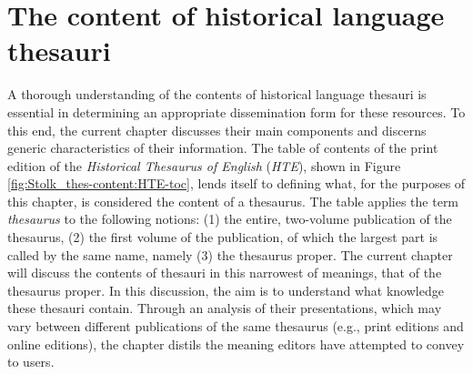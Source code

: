 

\chapter{The content of historical language thesauri}

A thorough understanding of the contents of historical language thesauri is essential in determining an appropriate dissemination form for these resources. To this end, the current chapter discusses their main components and discerns generic characteristics of their information. The table of contents of the print edition of the \textit{Historical Thesaurus of English} (\textit{HTE}), shown in Figure \ref{fig:Stolk_thes-content:HTE-toc}, lends itself to defining what, for the purposes of this chapter, is considered the content of a thesaurus. The table applies the term \textit{thesaurus} to the following notions: (1) the entire, two-volume publication of the thesaurus, (2) the first volume of the publication, of which the largest part is called by the same name, namely (3) the thesaurus proper. The current chapter will discuss the contents of thesauri in this narrowest of meanings, that of the thesaurus proper. 
%
%
In this discussion, the aim is to understand what knowledge these thesauri contain. Through an analysis of their presentations, 
which may vary between different publications of the same thesaurus (e.g., print editions and online editions), the chapter distils the meaning editors have attempted to convey to users.


